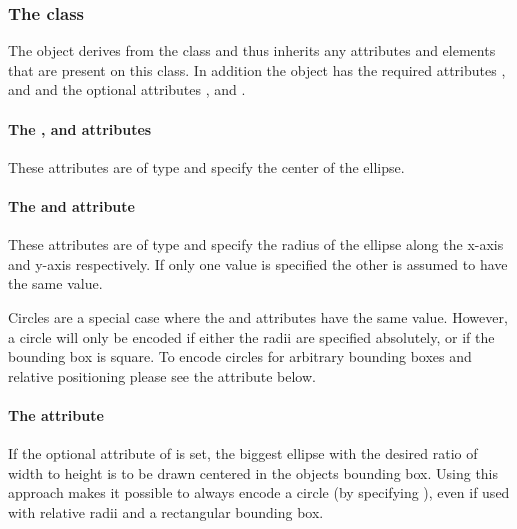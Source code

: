\subsubsection{The  class}
\label{renderellipse-class}


The \RenderEllipse object derives from the \GraphicalPrimitiveTwoD class
and thus inherits any attributes and elements that are present on this
class.
In addition the \RenderEllipse object has the required attributes , 
 and  and the optional attributes ,  and .

\paragraph{The \fixttspace{}, \fixttspace{} and \fixttspace{}  attributes}

These attributes are of type
\RelAbsVector and specify the center of the ellipse.

\paragraph{The \fixttspace{} and \fixttspace{} attribute}

These attributes are of type
\RelAbsVector and specify the radius of the ellipse along the x-axis and y-axis 
respectively. If only one value is specified the other is assumed to have the same value. 

Circles are a special case where the  and  attributes have the same value. However, 
a circle will only be encoded if either the radii are specified absolutely, or if the bounding box is square. 
To encode circles for arbitrary bounding boxes and relative positioning please see the  
attribute below.

\paragraph{The \fixttspace{} attribute}
If the optional  attribute of  is set, the biggest 
ellipse with the desired ratio of width to height is to be drawn centered in the 
objects bounding box. Using this approach makes it possible to always encode a 
circle (by specifying ), even if used with relative radii and a
rectangular bounding box. 

